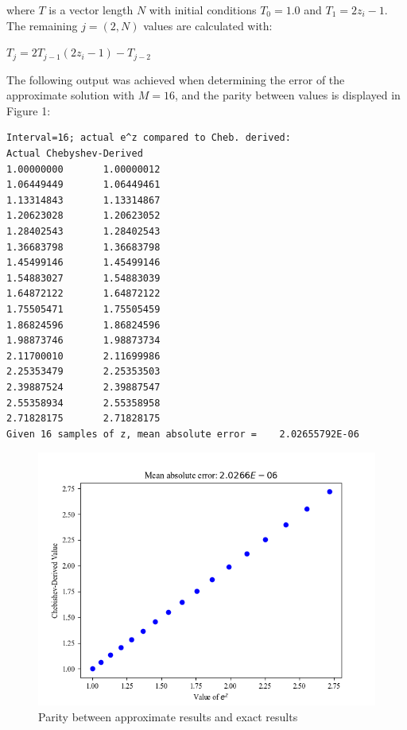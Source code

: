 \documentclass{report}
\begin{document}
	\noindent where $T$ is a vector length $N$ with initial conditions $T_0 = 1.0$ and $T_1 = 2z_i - 1$. The remaining $j=(2, N)$ values are calculated with:
	
	\begin{center}
		
		$T_j = 2T_{j-1}(2z_i - 1) - T_{j-2}$
		
	\end{center}

	\noindent The following output was achieved when determining the error of the approximate solution with $M = 16$, and the parity between values is displayed in Figure 1:
	
	\begin{lstlisting}
Interval=16; actual e^z compared to Cheb. derived:
Actual Chebyshev-Derived
1.00000000       1.00000012    
1.06449449       1.06449461    
1.13314843       1.13314867    
1.20623028       1.20623052    
1.28402543       1.28402543    
1.36683798       1.36683798    
1.45499146       1.45499146    
1.54883027       1.54883039    
1.64872122       1.64872122    
1.75505471       1.75505459    
1.86824596       1.86824596    
1.98873746       1.98873734    
2.11700010       2.11699986    
2.25353479       2.25353503    
2.39887524       2.39887547    
2.55358934       2.55358958    
2.71828175       2.71828175    
Given 16 samples of z, mean absolute error =    2.02655792E-06
	\end{lstlisting}
	
	\begin{figure}[!ht]
		\centering
		\includegraphics[scale=0.7]{figures/results_partb.png}
		\caption{Parity between approximate results and exact results}
	\end{figure}
\end{document}
